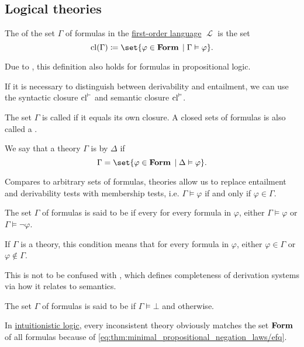 \subsection{Logical theories}\label{subsec:logical_theories}

\begin{definition}\label{def:first_order_theory}
  The  of the set \( \Gamma \) of formulas in the \hyperref[def:first_order_syntax]{first-order language} \( \mscrL \) is the set
  \begin{equation*}
    \cl(\Gamma) \coloneqq \set{ \varphi \in \boldop{Form} \given \Gamma \vDash \varphi }.
  \end{equation*}

  Due to , this definition also holds for formulas in propositional logic.

  If it is necessary to distinguish between derivability and entailment, we can use the syntactic closure \( \operatorname{cl}^\vdash \) and semantic closure \( \operatorname{cl}^\vDash \).

  The set \( \Gamma \) is called  if it equals its own closure. A closed sets of formulas is also called a .

  We say that a theory \( \Gamma \) is  by \( \Delta \) if
  \begin{equation*}
    \Gamma = \set{ \varphi \in \boldop{Form} \given \Delta \vDash \varphi }.
  \end{equation*}

  Compares to arbitrary sets of formulas, theories allow us to replace entailment and derivability tests with membership tests, i.e. \( \Gamma \vDash \varphi \) if and only if \( \varphi \in \Gamma \).

  \begin{thmenum}
     The set \( \Gamma \) of formulas is said to be  if every for every formula in \( \varphi \), either \( \Gamma \vDash \varphi \) or \( \Gamma \vDash \neg \varphi \).

    If \( \Gamma \) is a theory, this condition means that for every formula in \( \varphi \), either \( \varphi \in \Gamma \) or \( \varphi \not\in \Gamma \).

    This is not to be confused with , which defines completeness of derivation systems via how it relates to semantics.

     The set \( \Gamma \) of formulas is said to be  if \( \Gamma \vDash \bot \) and  otherwise.

    In \hyperref[def:intuitionistic_logic]{intuitionistic logic}, every inconsistent theory obviously matches the set \( \operatorname{\mathbf{Form}} \) of all formulas because of \eqref{eq:thm:minimal_propositional_negation_laws/efq}.
  \end{thmenum}
\end{definition}

